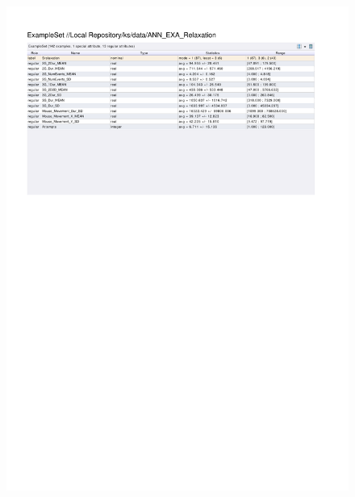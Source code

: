 \begin{figure}[htp]
  \centerline{\includegraphics[trim=0 600 0 60,clip,width=16.09cm]{results/ANN_EXA_Relaxation.pdf}} \caption{
} \label{ANN_K_Relaxation}
\end{figure}

